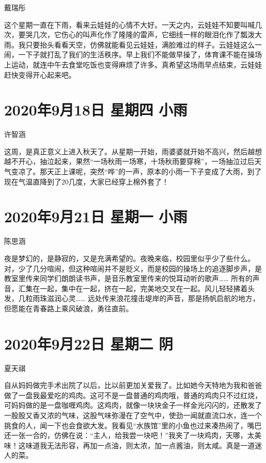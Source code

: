 戴瑞彤

这个星期一直在下雨，看来云娃娃的心情不大好。一天之内，云娃娃不知要叫喊几次，要哭几次，它伤心的叫声化作了隆隆的雷声，它细线一样的眼泪化作了瓢泼大雨。我只要抬头看看天空，仿佛就能看见云娃娃，满脸难过的样子。云娃娃这么一闹，一下子就打乱了我们的生活秩序。早上我们不能做早操了，体育课不能在操场上运动，就连中午去食堂吃饭也变得麻烦了许多。真希望这场雨早点结束，云娃娃赶快变得开心起来吧。

\section{2020年9月18日 星期四 小雨}

许智涵

这周，是真正意义上进入秋天了。从星期一开始，雨婆婆就开始不高兴，然后越想越不开心，抽泣起来，果然“一场秋雨一场寒，十场秋雨要穿棉”，一场抽泣过后天气变凉了。那天正上课呢，突然“哗”的一声，原本的小雨一下子变成了大雨，到了现在气温直降到了20几度，大家已经穿上棉外套了！

\section{2020年9月21日 星期一 小雨}

陈思涵

夜是梦幻的，是静寂的，又是充满希望的。夜晚来临，校园里似乎少了些什么。对，少了几分喧闹，但这种喧闹并不是贬义，而是校园的操场上的追逐脚步声，是教室里传来同学们朗朗读书声，是音乐教室里传来的悦耳动听的歌声…… 所有的声音，汇集在一起，集中在一起，挤在一起，完美地交叉在一起。风儿轻轻拂着头发，几粒雨珠滋润心灵…… 远处传来浪花撞击堤岸的声音，那是扬帆启航的地方，但愿能在青春路上乘风破浪，勇往直前。

\section{2020年9月22日 星期二 阴}

夏天祺

自从妈妈做完手术出院了以后，比以前更加关爱我了。比如她今天特地为我和爸爸做了一盘我最爱吃的鸡肉。这可不是一盘普通的鸡肉哦，普通的鸡肉只不过红烧，可妈妈做的是一盘咖喱鸡肉。这鸡肉，就像一块块金子一样金光闪闪的，还散发了一股股又香又浓的气味，这股气味弥漫在了空气中，使劲一闻就直流口水，连一个挑食的人，闻一下也会食欲大发。我看见“水族馆”里的小鱼也过来凑热闹了，嘴巴还一张一合的，仿佛在说：“主人，给我尝一块吧！”我夹了一块鸡肉，天哪，太美味！这味道我无法形容，再加一点油，则太浓，加一点酱油，则太咸。真是一道迷人的菜。

